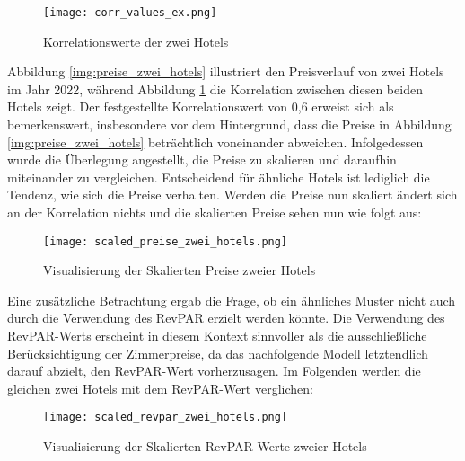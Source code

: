 \begin{figure}[h]
    \centering
    \texttt{[image: corr\_values\_ex.png]}
    \caption[Korrelationswerte der zwei Hotels]{Korrelationswerte der zwei Hotels}
    \label{img:corr_values_ex}
\end{figure}

Abbildung \ref{img:preise_zwei_hotels} illustriert den Preisverlauf von zwei Hotels im Jahr 2022, während Abbildung \ref{img:corr_values_ex} die Korrelation zwischen diesen beiden Hotels zeigt. Der festgestellte Korrelationswert von 0,6 erweist sich als bemerkenswert, insbesondere vor dem Hintergrund, dass die Preise in Abbildung \ref{img:preise_zwei_hotels} beträchtlich voneinander abweichen. Infolgedessen wurde die Überlegung angestellt, die Preise zu skalieren und daraufhin miteinander zu vergleichen. Entscheidend für ähnliche Hotels ist lediglich die Tendenz, wie sich die Preise verhalten. 
\newline
\newline
Werden die Preise nun skaliert ändert sich an der Korrelation nichts und die skalierten Preise sehen nun wie folgt aus:

\begin{figure}[h]
    \centering
    \texttt{[image: scaled\_preise\_zwei\_hotels.png]}
    \caption[Visualisierung der Skalierten Preise zweier Hotels]{Visualisierung der Skalierten Preise zweier Hotels}
    \label{img:scaled_preise_zwei_hotels}
\end{figure}

Eine zusätzliche Betrachtung ergab die Frage, ob ein ähnliches Muster nicht auch durch die Verwendung des RevPAR erzielt werden könnte. Die Verwendung des RevPAR-Werts erscheint in diesem Kontext sinnvoller als die ausschließliche Berücksichtigung der Zimmerpreise, da das nachfolgende Modell letztendlich darauf abzielt, den RevPAR-Wert vorherzusagen.
\newline
\newline
Im Folgenden werden die gleichen zwei Hotels mit dem RevPAR-Wert verglichen:

\begin{figure}[h]
    \centering
    \texttt{[image: scaled\_revpar\_zwei\_hotels.png]}
    \caption[Visualisierung der Skalierten RevPAR-Werte zweier Hotels]{Visualisierung der Skalierten RevPAR-Werte zweier Hotels}
    \label{img:scaled_revpar_zwei_hotels}
\end{figure}

